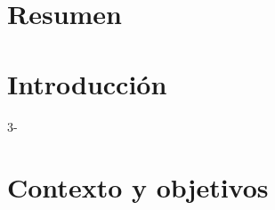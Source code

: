 \documentclass[letterpaper, 11pt, oneside]{book}
\begin{document}
	
\renewcommand{\tablename}{Tabla}



\renewcommand{\thepage}{\roman{page}}


\newpage



\renewcommand{\contentsname}{Tabla de Contenido}
\tableofcontents

\renewcommand{\listfigurename}{Lista de Figuras}
\listoffigures 

\renewcommand{\listtablename}{Lista de tablas}
\listoftables

\chapter*{Resumen}
\label{capResumen}



\thispagestyle{empty}


\chapter*{Introducción}
\label{capIntro}

\thispagestyle{empty}3-


\chapter{Contexto y objetivos}
\label{cap1}
\renewcommand{\thepage}{\arabic{page}}
\setcounter{page}{1}













\end{document}

